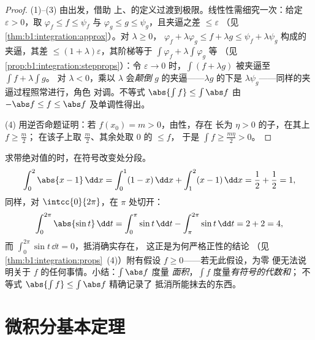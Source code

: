\begin{proof}
(1)--(3) 由出发，借助
上、的定义过渡到极限。线性性需细究一次：给定
$\varepsilon > 0$，取 $\varphi_f \leq f \leq \psi_f$ 与
$\varphi_g \leq g \leq \psi_g$，且夹逼之差 $\leq \varepsilon$
（见\cref{thm:b1:integration:approx}）。对 $\lambda \geq 0$，
$\varphi_f + \lambda\varphi_g \leq f + \lambda g \leq \psi_f +
\lambda\psi_g$ 构成的夹逼，其差 $\leq
(1 + \lambda)\varepsilon$，其阶梯等于 $\int
\varphi_f + \lambda\int\varphi_g$ 等
（见\cref{prop:b1:integration:stepprops}）：令 $\varepsilon \to
0$ 时，$\int(f + \lambda g)$ 被夹逼至 $\int f + \lambda\int g$。
对 $\lambda < 0$，乘以 $\lambda$ 会\emph{颠倒}
$g$ 的夹逼——$\lambda g$ 的下是
$\lambda \psi_g$——同样的夹逼过程照常进行，角色
对调。不等式 $\abs{\int f} \leq \int \abs f$ 由
$-\abs f \leq f \leq \abs f$ 及单调性得出。

(4) 用逆否命题证明：若 $f(x_0) = m > 0$，由性，存在
长为 $\eta > 0$ 的子，在其上 $f \geq \frac m2$；
在该子上取 $\frac m2$、其余处取 $0$ 的 $\leq f$，
于是 $\int f \geq \frac{m\eta}{2} > 0$。
\end{proof}

\begin{example}\label{ex:b1:integration:chasleswork}
求带绝对值的时，在符号改变处分段。
\[
\int_0^2 \abs{x - 1}\,\dd x
= \int_0^1 (1 - x)\,\dd x + \int_1^2 (x - 1)\,\dd x
= \frac12 + \frac12 = 1 ,
\]
同样，对 $\intcc{0}{2\pi}$，在 $\pi$ 处切开：
\[
\int_0^{2\pi} \abs{\sin t}\,\dd t
= \int_0^{\pi} \sin t\,\dd t - \int_{\pi}^{2\pi} \sin t\,\dd t
= 2 + 2 = 4 ,
\]
而 $\int_0^{2\pi} \sin t\,\dd t = 0$，抵消确实存在，
这正是为何严格正性的结论
（见\cref{thm:b1:integration:props}~(4)）附有假设 $f
\geq 0$——若无此假设，为零
便无法说明关于 $f$ 的任何事情。小结：$\int \abs f$ 度量
\emph{面积}，$\int f$ 度量\emph{有符号的代数和}；
不等式 $\abs{\int f} \leq \int\abs f$ 精确记录了
抵消所能抹去的东西。
\end{example}

\section{微积分基本定理}

